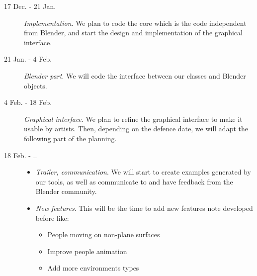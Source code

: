\documentclass[a4paper,11pt]{article}
\begin{document}
\begin{description}
  \item[17 Dec. - 21 Jan.] \textit{Implementation}. We plan to code the core which is the code independent from Blender, and start the design and implementation of the graphical interface.
  \item[21 Jan. - 4 Feb.] \textit{Blender part}. We will code the interface between our classes and Blender objects.
  \item[4 Feb. - 18 Feb.] \textit{Graphical interface}. We plan to refine the graphical interface to make it usable by artists. Then, depending on the defence date, we will adapt the following part of the planning.
  \item[18 Feb. - ..] \begin{itemize} \item \textit{Trailer, communication}. We will start to create examples generated by our tools, as well as communicate to and have feedback from the Blender community. \item \textit{New features}.
This will be the time to add new features note developed before like:
  \begin{itemize}
    \item People moving on non-plane surfaces
    \item Improve people animation
    \item Add more environments types
  \end{itemize}
  \end{itemize}
\end{description}













\newpage
\begingroup




\endgroup
\end{document}
